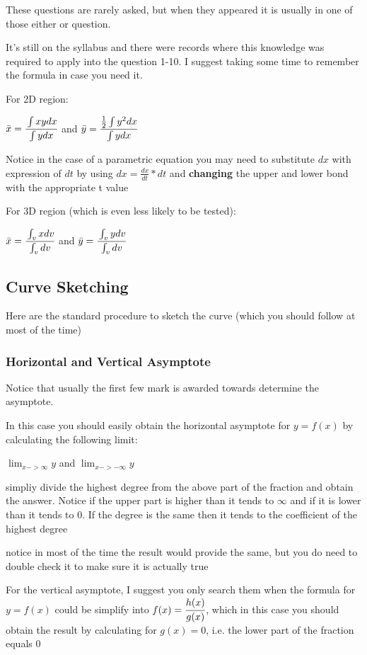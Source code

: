 \documentclass[]{article}
\begin{document}
These questions are rarely asked, but when they appeared it is usually
in one of those either or question.

It's still on the syllabus and there were records where this knowledge
was required to apply into the question 1-10. I suggest taking some time
to remember the formula in case you need it.

For 2D region:

\(\bar{x} = \cfrac{\int{xy}dx}{\int{y}dx}\) and
\(\bar{y} = \cfrac{\frac{1}{2}\int{y^2}dx}{\int{y}dx}\)

Notice in the case of a parametric equation you may need to substitute
\(dx\) with expression of \(dt\) by using \(dx = \frac{dx}{dt} * dt\)
and \textbf{changing} the upper and lower bond with the appropriate t
value

For 3D region (which is even less likely to be tested):

\(\bar{x} = \cfrac{\int_v{x}dv}{\int_v dv}\) and
\(\bar{y} = \cfrac{\int_v{y}dv}{\int_v dv}\)

\subsection{Curve Sketching}\label{header-n158}

Here are the standard procedure to sketch the curve (which you should
follow at most of the time)

\subsubsection{Horizontal and Vertical Asymptote}\label{header-n160}

Notice that usually the first few mark is awarded towards determine the
asymptote.

In this case you should easily obtain the horizontal asymptote for
\(y = f(x)\) by calculating the following limit:

\(\lim_{x->\infty} y \) and \(\lim_{x-> - \infty} y \)

simpliy divide the highest degree from the above part of the fraction
and obtain the answer. Notice if the upper part is higher than it tends
to \(\infty\) and if it is lower than it tends to 0. If the degree is
the same then it tends to the coefficient of the highest degree

notice in most of the time the result would provide the same, but you do
need to double check it to make sure it is actually true

For the vertical asymptote, I suggest you only search them when the
formula for \(y = f(x)\) could be simplify into
\(f(x) = \cfrac{h(x)}{g(x)}\), which in this case you should obtain the
result by calculating for \(g(x) = 0\), i.e. the lower part of the
fraction equals 0
\end{document}

